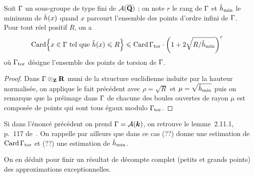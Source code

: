 \begin{coro} \label{c:small-va}
  Soit \( \Gamma \) un sous-groupe de type fini de \( \mathcal A(\overline{{\mathbf{Q}}}) \) ; on note
  \( r \) le rang de \( \Gamma \) et \( \hat h_{\mathrm{min}} \) le minimum de \(
    \hat h (x) \) quand \( x \) parcourt l'ensemble des points d'ordre infini de
  \( \Gamma \).  Pour tout réel positif \( R \), on a
  \begin{equation}
    \card \set*{
      x \in \grp
      \text{ tel que }
      \hautn x \le R
    }
    \le
    \card \Gamma_\torsion
    \cdot
    \left( 1 + 2\sqrt{R / \hmin} \right)^r
  \end{equation}
  où \( \Gamma_{\mathrm{tor}} \) désigne l'ensemble des points de torsion de \(
    \Gamma \).
\end{coro}

\begin{proof}
  Dans \( \Gamma \otimes_{\mathbf{Z}} {\mathbf{R}} \) muni de la structure euclidienne induite par
  la hauteur normalisée, on applique le fait précédent avec \( \rho = \sqrt R
  \) et \( \mu = \sqrt{\hat h_{\mathrm{min}}} \) puis on remarque que la préimage dans \(
    \Gamma \) de chacune des boules ouvertes de rayon \( \mu \) est composée
  de points qui sont tous égaux modulo \( \Gamma_{\mathrm{tor}} \).
\end{proof}

\begin{rem}
  Si dans l'énoncé précédent on prend \( \Gamma = \mathcal A({\boldsymbol k}) \), on retrouve le
  lemme~2.11.1, p.~117 de~\cite{farhith}. On rappelle par ailleurs que dans ce
  cas (\todo??) donne une estimation de \( \operatorname{Card} \Gamma_{\mathrm{tor}} \) et
  (\todo??) une estimation de \( \hat h_{\mathrm{min}} \).
\end{rem}

On en déduit pour finir un résultat de décompte complet (petits et grands
points) des approximations exceptionnelles.

